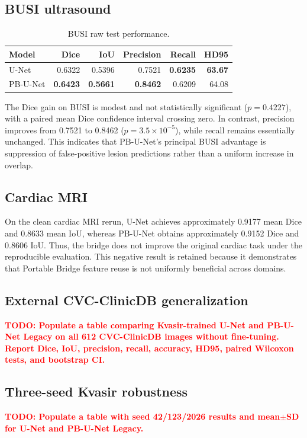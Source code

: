 \documentclass[11pt]{article}
\newcommand{\todoresult}[1]{\textcolor{red}{\textbf{TODO: #1}}}
\begin{document}
\subsection{BUSI ultrasound}
\begin{table}[H]
\centering
\caption{BUSI raw test performance.}
\begin{tabular}{lrrrrr}
\toprule
Model & Dice & IoU & Precision & Recall & HD95 \\
\midrule
U-Net & 0.6322 & 0.5396 & 0.7521 & \textbf{0.6235} & \textbf{63.67} \\
PB-U-Net & \textbf{0.6423} & \textbf{0.5661} & \textbf{0.8462} & 0.6209 & 64.08 \\
\bottomrule
\end{tabular}
\end{table}
The Dice gain on BUSI is modest and not statistically significant ($p=0.4227$), with a paired mean Dice confidence interval crossing zero. In contrast, precision improves from 0.7521 to 0.8462 ($p=3.5\times10^{-5}$), while recall remains essentially unchanged. This indicates that PB-U-Net's principal BUSI advantage is suppression of false-positive lesion predictions rather than a uniform increase in overlap.

\subsection{Cardiac MRI}
On the clean cardiac MRI rerun, U-Net achieves approximately 0.9177 mean Dice and 0.8633 mean IoU, whereas PB-U-Net obtains approximately 0.9152 Dice and 0.8606 IoU. Thus, the bridge does not improve the original cardiac task under the reproducible evaluation. This negative result is retained because it demonstrates that Portable Bridge feature reuse is not uniformly beneficial across domains.

\subsection{External CVC-ClinicDB generalization}
\todoresult{Populate a table comparing Kvasir-trained U-Net and PB-U-Net Legacy on all 612 CVC-ClinicDB images without fine-tuning. Report Dice, IoU, precision, recall, accuracy, HD95, paired Wilcoxon tests, and bootstrap CI.}

\subsection{Three-seed Kvasir robustness}
\todoresult{Populate a table with seed 42/123/2026 results and mean$\pm$SD for U-Net and PB-U-Net Legacy.}
\end{document}
